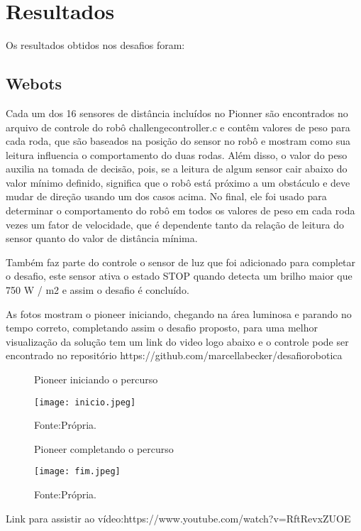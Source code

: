 \chapter{Resultados}
\label{chap:result}
Os resultados obtidos nos desafios foram:
\section{Webots}

Cada um dos 16 sensores de distância incluídos no Pionner são encontrados no arquivo de controle do robô challengecontroller.c
e contêm valores de peso para cada roda, que são baseados na posição do sensor no robô e mostram como sua leitura influencia o 
comportamento do duas rodas. Além disso, o valor do peso auxilia na tomada de decisão, pois, se a leitura de algum sensor cair 
abaixo do valor mínimo definido, significa que o robô está próximo a um obstáculo e deve mudar de direção usando um dos casos acima. 
No final, ele foi usado para determinar o comportamento do robô em todos os valores de peso em cada roda vezes um fator de velocidade, 
que é dependente tanto da relação de leitura do sensor quanto do valor de distância mínima.

Também faz parte do controle o sensor de luz que foi adicionado para completar o desafio, 
este sensor ativa o estado STOP quando detecta um brilho maior que 750 W / m2 e assim o desafio é concluído.

As fotos mostram o pioneer iniciando, chegando na área luminosa e parando no tempo correto, completando assim o desafio proposto,
para uma melhor visualização da solução tem um link do video logo abaixo e o controle pode ser encontrado no repositório https://github.com/marcellabecker/desafiorobotica 

\begin{figure} [h!]	
    \centering
    \caption{Pioneer iniciando o percurso}
    \texttt{[image: inicio.jpeg]}
    \caption*{Fonte:Própria.}
    \label{fig:inciodopercurso}
\end{figure}

\begin{figure} [h!]	
    \centering
    \caption{Pioneer completando o percurso}
    \texttt{[image: fim.jpeg]}
    \caption*{Fonte:Própria.}
    \label{fig:fimdopercurso}
\end{figure}



Link para assistir ao vídeo:https://www.youtube.com/watch?v=RftRevxZUOE

